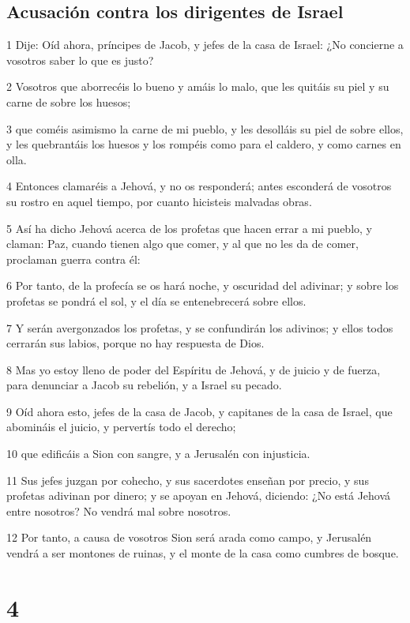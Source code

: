 \section*{Acusación contra los dirigentes de Israel}

\par 1 Dije: Oíd ahora, príncipes de Jacob, y jefes de la casa de Israel: ¿No concierne a vosotros saber lo que es justo?
\par 2 Vosotros que aborrecéis lo bueno y amáis lo malo, que les quitáis su piel y su carne de sobre los huesos; 
\par 3 que coméis asimismo la carne de mi pueblo, y les desolláis su piel de sobre ellos, y les quebrantáis los huesos y los rompéis como para el caldero, y como carnes en olla.
\par 4 Entonces clamaréis a Jehová, y no os responderá; antes esconderá de vosotros su rostro en aquel tiempo, por cuanto hicisteis malvadas obras.
\par 5 Así ha dicho Jehová acerca de los profetas que hacen errar a mi pueblo, y claman: Paz, cuando tienen algo que comer, y al que no les da de comer, proclaman guerra contra él:
\par 6 Por tanto, de la profecía se os hará noche, y oscuridad del adivinar; y sobre los profetas se pondrá el sol, y el día se entenebrecerá sobre ellos.
\par 7 Y serán avergonzados los profetas, y se confundirán los adivinos; y ellos todos cerrarán sus labios, porque no hay respuesta de Dios.
\par 8 Mas yo estoy lleno de poder del Espíritu de Jehová, y de juicio y de fuerza, para denunciar a Jacob su rebelión, y a Israel su pecado.
\par 9 Oíd ahora esto, jefes de la casa de Jacob, y capitanes de la casa de Israel, que abomináis el juicio, y pervertís todo el derecho;
\par 10 que edificáis a Sion con sangre, y a Jerusalén con injusticia.
\par 11 Sus jefes juzgan por cohecho, y sus sacerdotes enseñan por precio, y sus profetas adivinan por dinero; y se apoyan en Jehová, diciendo: ¿No está Jehová entre nosotros? No vendrá mal sobre nosotros.
\par 12 Por tanto, a causa de vosotros Sion será arada como campo, y Jerusalén vendrá a ser montones de ruinas, y el monte de la casa como cumbres de bosque. 

\chapter{4}

